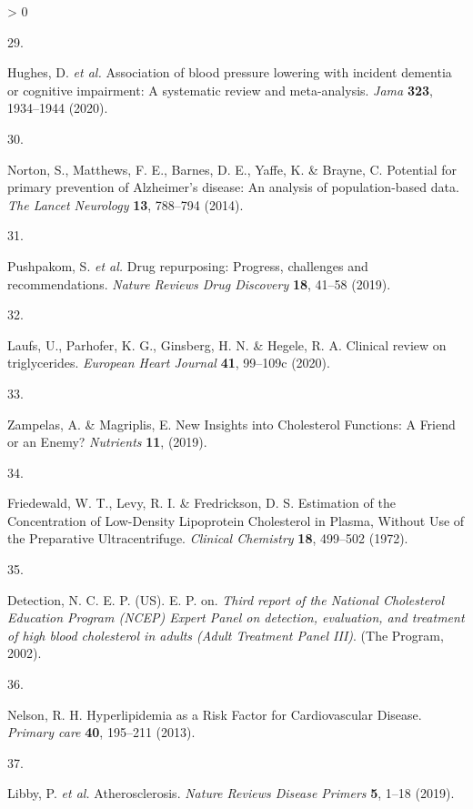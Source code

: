 \documentclass[a4paper, twoside]{templates/ociamthesis}
\newlength{\cslhangindent}
\newlength{\csllabelwidth}
\newenvironment{CSLReferences}[3] %
 {%
  \setlength{\parindent}{0pt}
  \ifodd #1 \everypar{\setlength{\hangindent}{\cslhangindent}}\ignorespaces\fi
  \ifnum #2 > 0
  \setlength{\parskip}{#2\baselineskip}
  \fi
 }%
 {}
\newcommand{\CSLLeftMargin}[1]{\parbox[t]{\maxof{\widthof{#1}}{\csllabelwidth}}{#1}}
\newcommand{\CSLRightInline}[1]{\parbox[t]{\linewidth - \csllabelwidth}{#1}}
\begin{document}
\begin{CSLReferences}{0}{0}
\leavevmode\hypertarget{ref-hughes2020}{}%
\CSLLeftMargin{29. }
\CSLRightInline{Hughes, D. \emph{et al.} Association of blood pressure lowering with incident dementia or cognitive impairment: A systematic review and meta-analysis. \emph{Jama} \textbf{323}, 1934--1944 (2020).}

\leavevmode\hypertarget{ref-norton2014potential}{}%
\CSLLeftMargin{30. }
\CSLRightInline{Norton, S., Matthews, F. E., Barnes, D. E., Yaffe, K. \& Brayne, C. Potential for primary prevention of {Alzheimer}'s disease: An analysis of population-based data. \emph{The Lancet Neurology} \textbf{13}, 788--794 (2014).}

\leavevmode\hypertarget{ref-pushpakom2019}{}%
\CSLLeftMargin{31. }
\CSLRightInline{Pushpakom, S. \emph{et al.} Drug repurposing: Progress, challenges and recommendations. \emph{Nature Reviews Drug Discovery} \textbf{18}, 41--58 (2019).}

\leavevmode\hypertarget{ref-laufs2020}{}%
\CSLLeftMargin{32. }
\CSLRightInline{Laufs, U., Parhofer, K. G., Ginsberg, H. N. \& Hegele, R. A. Clinical review on triglycerides. \emph{European Heart Journal} \textbf{41}, 99--109c (2020).}

\leavevmode\hypertarget{ref-zampelas2019}{}%
\CSLLeftMargin{33. }
\CSLRightInline{Zampelas, A. \& Magriplis, E. New {Insights} into {Cholesterol Functions}: A {Friend} or an {Enemy}? \emph{Nutrients} \textbf{11}, (2019).}

\leavevmode\hypertarget{ref-friedewald1972}{}%
\CSLLeftMargin{34. }
\CSLRightInline{Friedewald, W. T., Levy, R. I. \& Fredrickson, D. S. Estimation of the {Concentration} of {Low}-{Density Lipoprotein Cholesterol} in {Plasma}, {Without Use} of the {Preparative Ultracentrifuge}. \emph{Clinical Chemistry} \textbf{18}, 499--502 (1972).}

\leavevmode\hypertarget{ref-national2002third}{}%
\CSLLeftMargin{35. }
\CSLRightInline{Detection, N. C. E. P. (US). E. P. on. \emph{Third report of the {National Cholesterol Education Program} ({NCEP}) {Expert Panel} on detection, evaluation, and treatment of high blood cholesterol in adults ({Adult Treatment Panel III})}. ({The Program}, 2002).}

\leavevmode\hypertarget{ref-nelson2013}{}%
\CSLLeftMargin{36. }
\CSLRightInline{Nelson, R. H. Hyperlipidemia as a {Risk Factor} for {Cardiovascular Disease}. \emph{Primary care} \textbf{40}, 195--211 (2013).}

\leavevmode\hypertarget{ref-libby2019}{}%
\CSLLeftMargin{37. }
\CSLRightInline{Libby, P. \emph{et al.} Atherosclerosis. \emph{Nature Reviews Disease Primers} \textbf{5}, 1--18 (2019).}


\end{CSLReferences}
\end{document}
